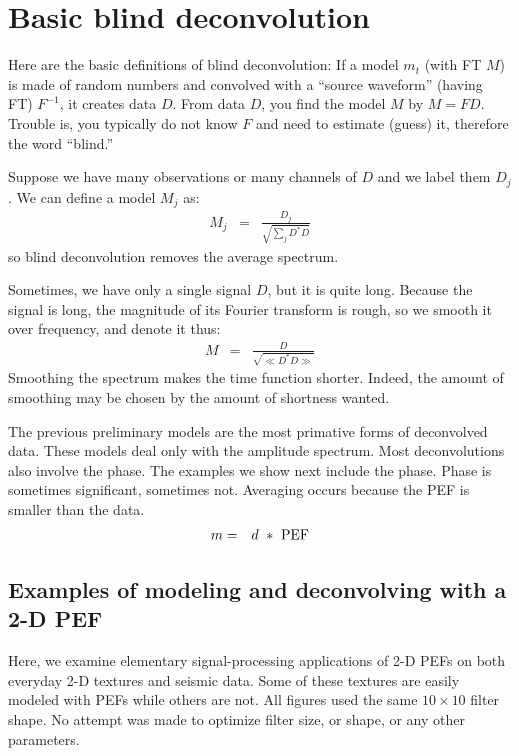 \section{Basic blind deconvolution}
Here are the basic definitions of blind deconvolution:
If a model $m_t$ (with FT $M$) is made of random numbers
and convolved with a ``source waveform'' (having FT) $F^{-1}$,
it creates data $D$.  From data $D$, you find the model $M$
by $M=FD$.   Trouble is, you typically do not know $F$ and need to estimate (guess) it,
therefore the word ``blind.''
\par
Suppose we have many observations or many channels of $D$ and we label them $D_j$.
We can define a model $M_j$ as:
\begin{eqnarray}
M_j &=& \frac{D_j}{ \sqrt{\sum_j D^\ast D}}
\end{eqnarray}
so blind deconvolution removes the average spectrum.
\par
Sometimes, we have only a single signal $D$, but it is quite long.
Because the signal is long, the magnitude of its Fourier transform is rough,
so we smooth it over frequency, and denote it thus:
\begin{eqnarray}
M &=& \frac{D}{ \sqrt{\ll D^\ast D\gg}}
\end{eqnarray}
Smoothing the spectrum makes the time function shorter.
Indeed, the amount of smoothing may be chosen by the amount of shortness wanted.
\par
The previous preliminary models are the most primative forms of deconvolved data.
These models deal only with the amplitude spectrum.
Most deconvolutions also involve the phase.
The examples we show next include the phase.
Phase is sometimes significant, sometimes not.
Averaging occurs because the PEF is smaller than the data.
\begin{eqnarray}
m &=&  d \ \ast \ {\rm PEF}
\end{eqnarray}


\subsection{Examples of modeling and deconvolving with a 2-D PEF }

Here,
we examine elementary signal-processing applications of 2-D PEFs
on both everyday 2-D textures and seismic data.
Some of these textures are easily modeled with PEFs while others are not.
All figures used the same $10\times 10$ filter shape.
No attempt was made to optimize filter size,
or shape, or any other parameters.

